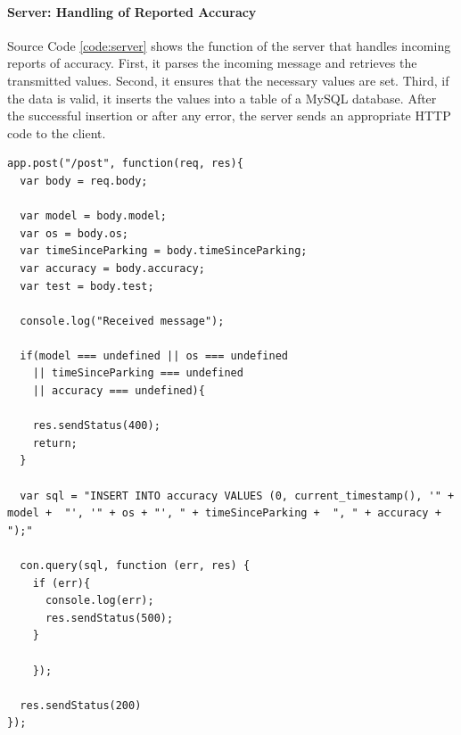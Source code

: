 \paragraph{Server: Handling of Reported Accuracy} Source Code \ref{code:server} shows the function of the server that handles incoming reports of accuracy. First, it parses the incoming message and retrieves the transmitted values. Second, it ensures that the necessary values are set. Third, if the data is valid, it inserts the values into a table of a MySQL database. After the successful insertion or after any error, the server sends an appropriate HTTP code to the client.


\begin{lstlisting}[style=JavaScript, caption={Server: Handling of Reported Accuracy}, label={code:server}]
app.post("/post", function(req, res){
  var body = req.body;

  var model = body.model;
  var os = body.os;
  var timeSinceParking = body.timeSinceParking;
  var accuracy = body.accuracy;
  var test = body.test;

  console.log("Received message");

  if(model === undefined || os === undefined
    || timeSinceParking === undefined
    || accuracy === undefined){

    res.sendStatus(400);
    return;
  }

  var sql = "INSERT INTO accuracy VALUES (0, current_timestamp(), '" + model +  "', '" + os + "', " + timeSinceParking +  ", " + accuracy +  ");"

  con.query(sql, function (err, res) {
    if (err){
      console.log(err);
      res.sendStatus(500);
    }

    });

  res.sendStatus(200)
});
\end{lstlisting}{}